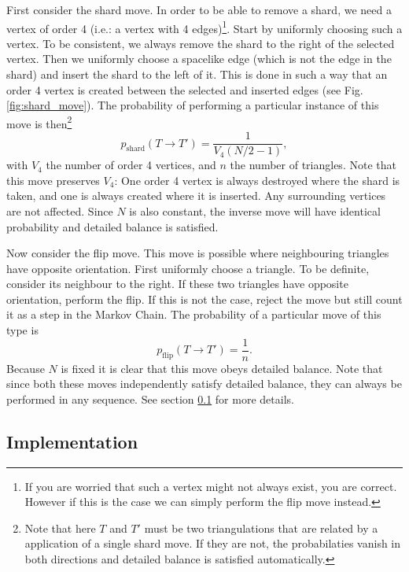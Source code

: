 First consider the shard move. In order to be able to remove a shard, we need a vertex of order 4 (i.e.: a vertex with 4 edges)\footnote{If you are worried that such a vertex might not always exist, you are correct. However if this is the case we can simply perform the flip move instead.}. Start by uniformly choosing such a vertex. To be consistent, we always remove the shard to the right of the selected vertex. Then we uniformly choose a spacelike edge (which is not the edge in the shard) and insert the shard to the left of it. This is done in such a way that an order 4 vertex is created between the selected and inserted edges (see Fig. \ref{fig:shard_move}). The probability of performing a particular instance of this move is then\footnote{Note that here $T$ and $T'$ must be two triangulations that are related by a application of a single shard move. If they are not, the probabilaties vanish in both directions and detailed balance is satisfied automatically.}
\begin{equation}
    p_{\text{shard}}(T \to T') = \frac{1}{V_4 (N/2 - 1)},
\end{equation}
with $V_4$ the number of order 4 vertices, and $n$ the number of triangles. Note that this move preserves $V_4$: One order 4 vertex is always destroyed where the shard is taken, and one is always created where it is inserted. Any surrounding vertices are not affected. Since $N$ is also constant, the inverse move will have identical probability and detailed balance is satisfied.

Now consider the flip move. This move is possible where neighbouring triangles have opposite orientation. First uniformly choose a triangle. To be definite, consider its neighbour to the right. If these two triangles have opposite orientation, perform the flip. If this is not the case, reject the move but still count it as a step in the Markov Chain. The probability of a particular move of this type is
\begin{equation}
    p_{\text{flip}}(T \to T') = \frac{1}{n}.
\end{equation}
Because $N$ is fixed it is clear that this move obeys detailed balance. Note that since both these moves independently satisfy detailed balance, they can always be performed in any sequence. See section \ref{sec:implementation} for more details.

\subsection{Implementation}\label{sec:implementation}

